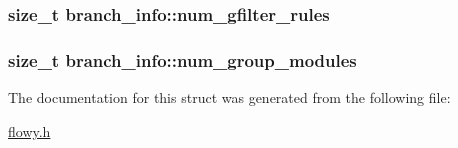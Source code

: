 \hypertarget{structbranch__info_ad65fbdeee3c34759d28a42fb653ddd19}{
\subsubsection[{num\-\_\-gfilter\-\_\-rules}]{\setlength{\rightskip}{0pt plus 5cm}size\-\_\-t {\bf branch\-\_\-info\-::num\-\_\-gfilter\-\_\-rules}}}\label{structbranch__info_ad65fbdeee3c34759d28a42fb653ddd19}
\hypertarget{structbranch__info_a55739e63096133c35770d4301e0b1707}{
\subsubsection[{num\-\_\-group\-\_\-modules}]{\setlength{\rightskip}{0pt plus 5cm}size\-\_\-t {\bf branch\-\_\-info\-::num\-\_\-group\-\_\-modules}}}\label{structbranch__info_a55739e63096133c35770d4301e0b1707}


\-The documentation for this struct was generated from the following file\-:\begin{DoxyCompactItemize}
\item 
\hyperlink{flowy_8h}{flowy.\-h}\end{DoxyCompactItemize}
